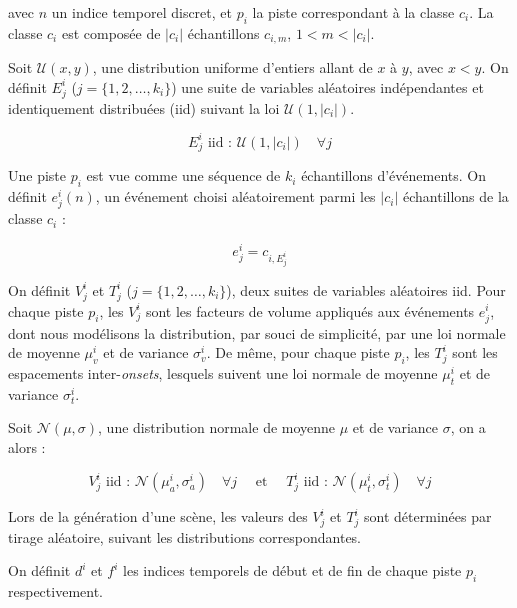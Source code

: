   avec $n$ un indice temporel discret, et $p_i$ la piste correspondant à la classe $c_i$. La classe $c_i$ est composée de $\vert c_i\vert$ échantillons $c_{i,m}$, $1<m<\vert c_i\vert$.

  Soit $\mathcal{U}(x,y)$, une distribution uniforme d'entiers allant de $x$ à $y$, avec $x<y$. On définit $E_j^i$ ($j=\lbrace 1,2,\ldots,k_i\rbrace$) une suite de variables aléatoires indépendantes et identiquement distribuées (iid) suivant la loi $\mathcal{U}(1,\vert c_i \vert)$.

  \begin{equation}
    E_j^i \textrm{ iid : } \mathcal{U}(1,\vert c_i \vert) \quad \forall j
  \end{equation}

  Une piste $p_i$ est vue comme une séquence de $k_i$ échantillons d'événements. On définit $e_j^i(n)$, un événement choisi aléatoirement parmi les $\vert c_i\vert$ échantillons de la classe $c_i$ :

  \begin{equation}
    e_j^i=c_{i,E_j^i}
  \end{equation}

  On définit $V^i_j$ et $T^i_j$ ($j=\lbrace 1,2,\ldots,k_i\rbrace$), deux suites de variables aléatoires iid. Pour chaque piste $p_i$, les $V^i_j$ sont les facteurs de volume appliqués aux événements $e_j^i$, dont nous modélisons la distribution, par souci de simplicité, par une loi normale de moyenne $\mu_v^i$ et de variance $\sigma_v^i$. De même, pour chaque piste $p_i$, les $T_j^i$ sont les espacements inter-\emph{onsets}, lesquels suivent une loi normale de moyenne $\mu_t^i$ et de variance $\sigma_t^i$.

  Soit $\mathcal{N}(\mu,\sigma)$, une distribution normale de moyenne $\mu$ et de variance $\sigma$, on a alors :

  \begin{equation}
    \label{eq:ch4_eq1}
    V_j^i \textrm{ iid : } \mathcal{N}(\mu_a^{i},\sigma_a^{i}) \quad \forall j \quad \textrm{ et } \quad T_j^i \textrm{ iid : } \mathcal{N}({\mu_t^{i},\sigma_t^{i}}) \quad \forall j
  \end{equation}

  Lors de la génération d'une scène, les valeurs des $V^i_j$ et $T_j^i$ sont déterminées par tirage aléatoire, suivant les distributions correspondantes.

  On définit $d^i$ et $f^i$ les indices temporels de début et de fin de chaque piste $p_i$ respectivement.

